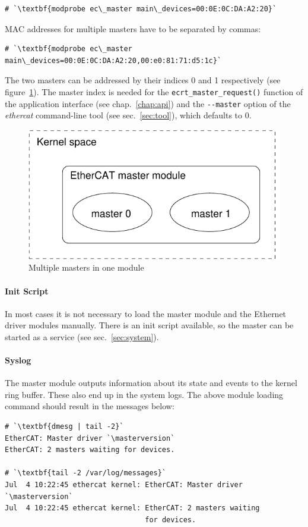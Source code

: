 \documentclass[a4paper,12pt,BCOR6mm,bibtotoc,idxtotoc]{scrbook}
\newcommand{\masterversion}{1.4.0}
\begin{document}
\begin{lstlisting}
# `\textbf{modprobe ec\_master main\_devices=00:0E:0C:DA:A2:20}`
\end{lstlisting}

MAC addresses for multiple masters have to be separated by commas:

\begin{lstlisting}
# `\textbf{modprobe ec\_master main\_devices=00:0E:0C:DA:A2:20,00:e0:81:71:d5:1c}`
\end{lstlisting}

The two masters can be addressed by their indices 0 and 1 respectively (see
figure~\ref{fig:masters}). The master index is needed for the
\lstinline+ecrt_master_request()+ function of the application interface (see
chap.~\ref{chap:api}) and the \lstinline+--master+ option of the
\textit{ethercat} command-line tool (see sec.~\ref{sec:tool}), which defaults
to $0$.

\begin{figure}[htbp]
  \centering
  \includegraphics[width=.5\textwidth]{images/masters}
  \caption{Multiple masters in one module}
  \label{fig:masters}
\end{figure}

\paragraph{Init Script}

In most cases it is not necessary to load the master module and the Ethernet
driver modules manually. There is an init script available, so the master can
be started as a service (see sec.~\ref{sec:system}).

\paragraph{Syslog}

The master module outputs information about its state and events to the kernel
ring buffer. These also end up in the system logs.  The above module loading
command should result in the messages below:

\begin{lstlisting}
# `\textbf{dmesg | tail -2}`
EtherCAT: Master driver `\masterversion`
EtherCAT: 2 masters waiting for devices.

# `\textbf{tail -2 /var/log/messages}`
Jul  4 10:22:45 ethercat kernel: EtherCAT: Master driver `\masterversion`
Jul  4 10:22:45 ethercat kernel: EtherCAT: 2 masters waiting
                                 for devices.
\end{lstlisting}
\end{document}
